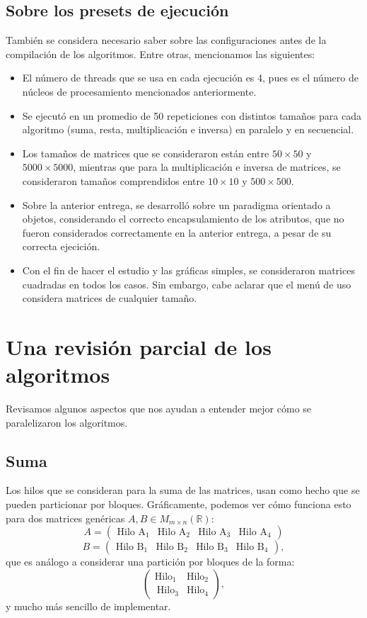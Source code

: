 \documentclass{article}
\begin{document}
\subsection*{Sobre los presets de ejecución}
También se considera necesario saber sobre las configuraciones antes de la compilación de los algoritmos. Entre otras, mencionamos las siguientes:
\begin{itemize}
	\item El número de threads que se usa en cada ejecución es 4, pues es el número de núcleos de procesamiento mencionados anteriormente.
	\item Se ejecutó en un promedio de 50 repeticiones con distintos tamaños para cada algoritmo (suma, resta, multiplicación e inversa) en paralelo y en secuencial.
	\item Los tamaños de matrices que se consideraron están entre $50\times 50$ y \linebreak $5000\times5000$, mientras que para la multiplicación e inversa de matrices, se consideraron tamaños comprendidos entre $10\times 10$ y $500\times 500$.
	\item Sobre la anterior entrega, se desarrolló sobre un paradigma orientado a objetos, considerando el correcto encapsulamiento de los atributos, que no fueron considerados correctamente en la anterior entrega, a pesar de su correcta ejecición.
	\item Con el fin de hacer el estudio y las gráficas  simples, se consideraron matrices cuadradas en todos los casos. Sin embargo, cabe aclarar que el menú de uso considera matrices de cualquier tamaño.
\end{itemize}
\section{Una revisión parcial de los algoritmos}
Revisamos algunos aspectos que nos ayudan a entender mejor cómo se paralelizaron los algoritmos.
\subsection*{Suma}
Los hilos que se consideran para la suma de las matrices, usan como hecho que se pueden particionar por bloques. Gráficamente, podemos ver cómo funciona esto para dos matrices genéricas $A,B\in M_{m\times n}(\mathbb{R})$:
\[ A = \begin{pmatrix}
	\text{Hilo A}_1 & \text{Hilo A}_2&	\text{Hilo A}_3& \text{Hilo A}_4
\end{pmatrix}
\]
\[ B = \begin{pmatrix}
	\text{Hilo B}_1 & \text{Hilo B}_2&	\text{Hilo B}_3& \text{Hilo B}_4
\end{pmatrix},
\]
que es análogo a considerar una partición por  bloques de la forma:
\[ 
\begin{pmatrix}
	\text{Hilo}_1 & \text{Hilo}_2\\\
	\text{Hilo}_3& \text{Hilo}_4
\end{pmatrix},
\]
y mucho más sencillo de implementar.
\end{document}
